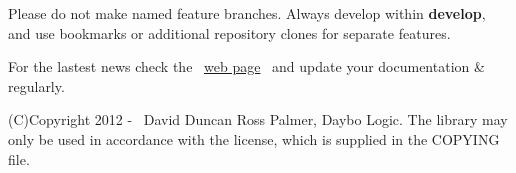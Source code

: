 \documentclass{article}
\begin{document}
Please do not make named feature branches.  Always develop within \textbf{develop}, and use bookmarks
or additional repository clones for separate features.

\par For the lastest news check the~ \href{http://bitbucket.org/daybologic/dlpodget}{web
page}~ and update your documentation \& regularly.


\par (C)Copyright 2012 -
\the\year
~David Duncan Ross Palmer, Daybo Logic. The library may only be used in accordance
with
the license, which is supplied in the COPYING file.\\
\end{document}
